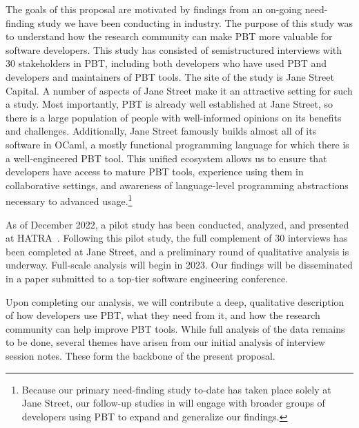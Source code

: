 %
The goals of this proposal are motivated by findings from an on-going
need-finding study we have been conducting in industry. The purpose of this
study was to understand how the research community can make PBT more valuable
for software developers. This study has consisted of semistructured interviews
with 30 stakeholders in PBT, including both developers who have used PBT and
developers and maintainers of PBT tools. The site of the study is Jane Street
Capital. A number of aspects of Jane Street make it
an attractive setting for such a study.  Most importantly, PBT is
already well established at Jane Street, so there is a large
population of people with well-informed opinions on its benefits and
challenges. Additionally, Jane Street famously builds almost all of its
software in OCaml, a mostly functional programming language for which
there is a well-engineered PBT tool. This unified
ecosystem allows us to ensure that developers have access to mature PBT tools,
experience using them in collaborative settings,
and awareness of language-level programming abstractions necessary
to advanced usage.\footnote{Because our primary need-finding study to-date has
taken place solely at Jane Street, our follow-up studies in
 will engage with broader groups of developers using
PBT to expand and generalize our findings.}

As of December 2022, a pilot study has been conducted, analyzed, and presented
at HATRA~\cite{goldstein_problems_2022}. Following this pilot study, the full
complement of 30 interviews has been completed at Jane Street, and a preliminary
round of qualitative analysis is underway. Full-scale analysis will
begin in 2023. Our findings will be disseminated in a paper submitted
to a top-tier software engineering conference.

 Upon completing
our analysis, we will contribute a deep, qualitative description of how
developers use PBT, what they need from it, and how the research community can
help improve PBT tools. While full analysis of the data remains
to be done, several themes have arisen from our initial analysis
of interview session notes. These form the backbone of the present proposal.

